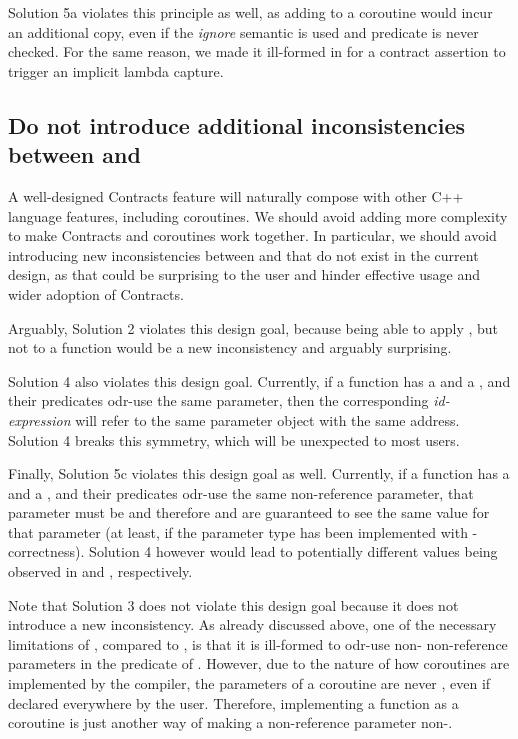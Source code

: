 Solution 5a violates this principle as well, as adding  to a coroutine would incur an additional copy, even if the \emph{ignore} semantic is used and predicate is never checked. For the same reason, we made it ill-formed in \cite{P2900R8} for a contract assertion to trigger an implicit lambda capture.

\subsection{Do not introduce additional inconsistencies between  and }

A well-designed Contracts feature will naturally compose with other C++ language features, including coroutines. We should avoid adding more complexity to make Contracts and coroutines work together. In particular, we should avoid introducing new inconsistencies between  and  that do not exist in the current design, as that could be surprising to the user and hinder effective usage and wider adoption of Contracts.

Arguably, Solution 2 violates this design goal, because being able to apply , but not  to a function would be a new inconsistency and arguably surprising.

Solution 4 also violates this design goal. Currently, if a function has a  and a , and their predicates odr-use the same parameter, then the corresponding \emph{id-expression} will refer to the same parameter object with the same address. Solution 4 breaks this symmetry, which will be unexpected to most users.

Finally, Solution 5c violates this design goal as well. Currently, if a function has a  and a , and their predicates odr-use the same non-reference parameter, that parameter must be  and therefore  and  are guaranteed to see the same value for that parameter (at least, if the parameter type has been implemented with -correctness). Solution 4 however would lead to potentially different values being observed in  and , respectively.

Note that Solution 3 does not violate this design goal because it does not introduce a new inconsistency. As already discussed above, one of the necessary limitations of , compared to , is that it is ill-formed to odr-use non- non-reference parameters in the predicate of . However, due to the nature of how coroutines are implemented by the compiler, the parameters of a coroutine are never , even if declared  everywhere by the user. Therefore, implementing a function as a coroutine is just another way of making a non-reference parameter non-.

